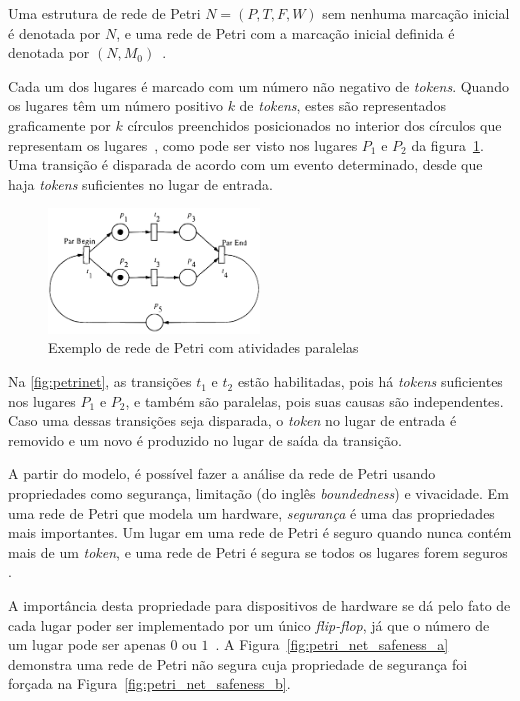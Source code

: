 Uma estrutura de rede de Petri \(N=(P,T,F,W)\) sem nenhuma marcação inicial é denotada por \(N\), e uma rede de Petri com a marcação inicial definida é denotada por \((N,M_0)\)~\cite{murata:1989}.

Cada um dos lugares é marcado com um número não negativo de \textit{tokens}. Quando os lugares têm um número positivo \(k\) de \textit{tokens}, estes são representados graficamente por \(k\) círculos preenchidos posicionados no interior dos círculos que representam os lugares~\cite{murata:1989}, como pode ser visto nos lugares \(P_1\) e \(P_2\) da figura~\ref{fig:petrinet}. Uma transição é disparada de acordo com um evento determinado, desde que haja \textit{tokens} suficientes no lugar de entrada.

\begin{figure}[ht]
	\caption{\label{fig:petrinet}Exemplo de rede de Petri com atividades paralelas}
	\begin{center}
	    \includegraphics[width=0.5\textwidth]{resources/petri_net_murata_1}
	\end{center}
\end{figure}

Na \autoref{fig:petrinet}, as transições $t_1$ e $t_2$ estão habilitadas, pois há \textit{tokens} suficientes nos lugares $P_1$ e $P_2$, e também são paralelas, pois suas causas são independentes. Caso uma dessas transições seja disparada, o \textit{token} no lugar de entrada é removido e um novo é produzido no lugar de saída da transição.

A partir do modelo, é possível fazer a análise da rede de Petri usando propriedades como segurança, limitação (do inglês \textit{boundedness}) e vivacidade. Em uma rede de Petri que modela um hardware, \textit{segurança} é uma das propriedades mais importantes. Um lugar em uma rede de Petri é seguro quando nunca contém mais de um \textit{token}, e uma rede de Petri é segura se todos os lugares forem seguros \cite{peterson:1981}.

A importância desta propriedade para dispositivos de hardware se dá pelo fato de cada lugar poder ser implementado por um único \textit{flip-flop}, já que o número de um lugar pode ser apenas $0$ ou $1$~\cite{peterson:1981}. A Figura~\ref{fig:petri_net_safeness_a} demonstra uma rede de Petri não segura cuja propriedade de segurança foi forçada na Figura~\ref{fig:petri_net_safeness_b}.

